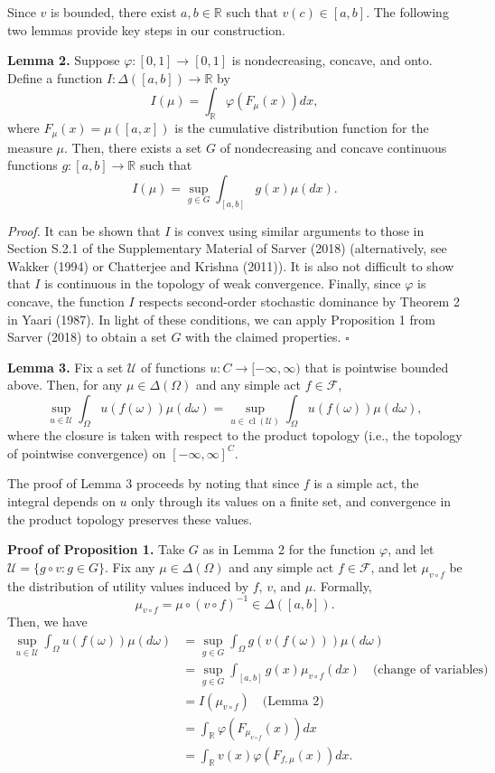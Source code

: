\documentclass[12pt,a4paper]{article}
\newenvironment{original}
  {\par\noindent\color{black}\smallskip}
  {\par\smallskip}
\begin{document}
\begin{original}
Since $v$ is bounded, there exist $a, b \in \mathbb{R}$ such that $v(c) \in [a, b]$. The following two lemmas provide key steps in our construction.

\textbf{Lemma 2.} Suppose $\varphi: [0, 1] \to [0, 1]$ is nondecreasing, concave, and onto. Define a function $I: \Delta([a, b]) \to \mathbb{R}$ by
\[
I(\mu) = \int_{\mathbb{R}} \varphi(F_\mu(x)) dx,
\]
where $F_\mu(x) = \mu([a, x])$ is the cumulative distribution function for the measure $\mu$. Then, there exists a set $G$ of nondecreasing and concave continuous functions $g: [a, b] \to \mathbb{R}$ such that
\[
I(\mu) = \sup_{g \in G} \int_{[a,b]} g(x) \mu(dx).
\]

\textit{Proof.} It can be shown that $I$ is convex using similar arguments to those in Section S.2.1 of the Supplementary Material of Sarver (2018) (alternatively, see Wakker (1994) or Chatterjee and Krishna (2011)). It is also not difficult to show that $I$ is continuous in the topology of weak convergence. Finally, since $\varphi$ is concave, the function $I$ respects second-order stochastic dominance by Theorem 2 in Yaari (1987). In light of these conditions, we can apply Proposition 1 from Sarver (2018) to obtain a set $G$ with the claimed properties. $\square$

\textbf{Lemma 3.} Fix a set $\mathcal{U}$ of functions $u: C \to [-\infty, \infty)$ that is pointwise bounded above. Then, for any $\mu \in \Delta(\Omega)$ and any simple act $f \in \mathcal{F}$,
\[
\sup_{u \in \mathcal{U}} \int_\Omega u(f(\omega)) \mu(d\omega) = \sup_{u \in \operatorname{cl}(\mathcal{U})} \int_\Omega u(f(\omega)) \mu(d\omega),
\]
where the closure is taken with respect to the product topology (i.e., the topology of pointwise convergence) on $[-\infty, \infty]^C$.

The proof of Lemma 3 proceeds by noting that since $f$ is a simple act, the integral depends on $u$ only through its values on a finite set, and convergence in the product topology preserves these values.

\textbf{Proof of Proposition 1.} Take $G$ as in Lemma 2 for the function $\varphi$, and let $\mathcal{U} = \{ g \circ v : g \in G \}$. Fix any $\mu \in \Delta(\Omega)$ and any simple act $f \in \mathcal{F}$, and let $\mu_{v\circ f}$ be the distribution of utility values induced by $f$, $v$, and $\mu$. Formally,
\[
\mu_{v\circ f} = \mu \circ (v \circ f)^{-1} \in \Delta([a, b]).
\]
Then, we have
\begin{align*}
\sup_{u \in \mathcal{U}} \int_\Omega u(f(\omega)) \mu(d\omega) &= \sup_{g \in G} \int_\Omega g(v(f(\omega))) \mu(d\omega) \\
&= \sup_{g \in G} \int_{[a,b]} g(x) \mu_{v\circ f}(dx) \quad \text{(change of variables)} \\
&= I(\mu_{v\circ f}) \quad \text{(Lemma 2)} \\
&= \int_{\mathbb{R}} \varphi(F_{\mu_{v\circ f}}(x)) dx \\
&= \int_{\mathbb{R}} v(x) \varphi(F_{f,\mu}(x)) dx.
\end{align*}


\end{original}
\end{document}
